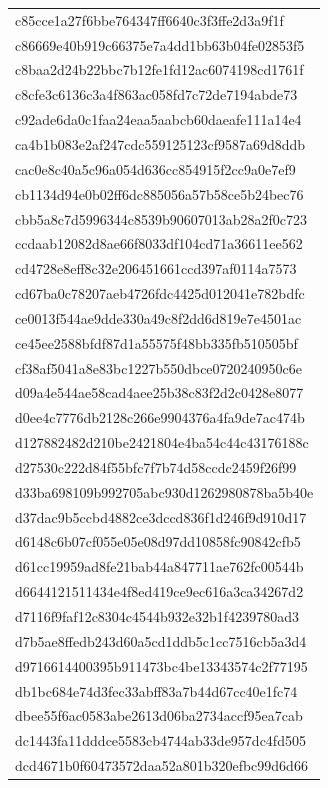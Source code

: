 \begin{tabular}{l}
c85cce1a27f6bbe764347ff6640c3f3ffe2d3a9f1f \\
c86669e40b919c66375e7a4dd1bb63b04fe02853f5 \\
c8baa2d24b22bbc7b12fe1fd12ac6074198cd1761f \\
c8cfe3c6136c3a4f863ac058fd7c72de7194abde73 \\
c92ade6da0c1faa24eaa5aabcb60daeafe111a14e4 \\
ca4b1b083e2af247cdc559125123cf9587a69d8ddb \\
cac0e8c40a5c96a054d636cc854915f2cc9a0e7ef9 \\
cb1134d94e0b02ff6dc885056a57b58ce5b24bec76 \\
cbb5a8c7d5996344c8539b90607013ab28a2f0c723 \\
ccdaab12082d8ae66f8033df104cd71a36611ee562 \\
cd4728e8eff8c32e206451661ccd397af0114a7573 \\
cd67ba0c78207aeb4726fdc4425d012041e782bdfc \\
ce0013f544ae9dde330a49c8f2dd6d819e7e4501ac \\
ce45ee2588bfdf87d1a55575f48bb335fb510505bf \\
cf38af5041a8e83bc1227b550dbce0720240950c6e \\
d09a4e544ae58cad4aee25b38c83f2d2c0428e8077 \\
d0ee4c7776db2128c266e9904376a4fa9de7ac474b \\
d127882482d210be2421804e4ba54c44c43176188c \\
d27530c222d84f55bfc7f7b74d58ccdc2459f26f99 \\
d33ba698109b992705abc930d1262980878ba5b40e \\
d37dac9b5ccbd4882ce3dccd836f1d246f9d910d17 \\
d6148c6b07cf055e05e08d97dd10858fc90842cfb5 \\
d61cc19959ad8fe21bab44a847711ae762fc00544b \\
d6644121511434e4f8ed419ce9ec616a3ca34267d2 \\
d7116f9faf12c8304c4544b932e32b1f4239780ad3 \\
d7b5ae8ffedb243d60a5cd1ddb5c1cc7516cb5a3d4 \\
d9716614400395b911473bc4be13343574c2f77195 \\
db1bc684e74d3fec33abff83a7b44d67cc40e1fc74 \\
dbee55f6ac0583abe2613d06ba2734accf95ea7cab \\
dc1443fa11dddce5583cb4744ab33de957dc4fd505 \\
dcd4671b0f60473572daa52a801b320efbc99d6d66 \\

\end{tabular}
